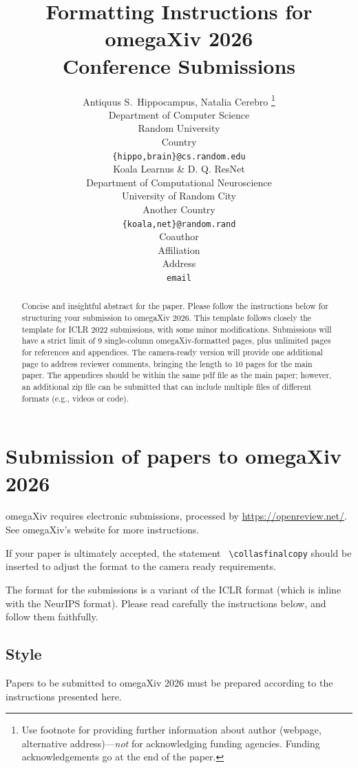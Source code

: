 \documentclass{article} %
\title{Formatting Instructions for omegaXiv 2026 \\ Conference Submissions}
\author{Antiquus S.~Hippocampus, Natalia Cerebro  \thanks{ Use footnote for providing further information
about author (webpage, alternative address)---\emph{not} for acknowledging
funding agencies.  Funding acknowledgements go at the end of the paper.} \\
Department of Computer Science\\
Random University\\
Country \\
\texttt{\{hippo,brain\}@cs.random.edu} \\
\And %
Koala Learnus \& D. Q. ResNet  \\
Department of Computational Neuroscience \\
University of Random City \\
Another Country \\
\texttt{\{koala,net\}@random.rand} \\
\AND %
Coauthor \\
Affiliation \\
Address \\
\texttt{email}
}
\begin{document}
\maketitle

\begin{abstract}
Concise and insightful abstract for the paper. Please follow the instructions below for structuring your submission to omegaXiv 2026. This template follows closely the template for ICLR 2022 submissions, with some minor modifications. Submissions will have a strict limit of 9 single-column omegaXiv-formatted pages, plus unlimited pages for references and appendices. The camera-ready version will provide one additional page to address reviewer comments, bringing the length to 10 pages for the main paper. The appendices should be within the same pdf file as the main paper; however, an additional zip file can be submitted that can include multiple files of different formats (e.g., videos or code).
\end{abstract}

\section{Submission of papers to omegaXiv 2026}

omegaXiv requires electronic submissions, processed by
\href{https://openreview.net/}{https://openreview.net/}. See omegaXiv's website for more instructions.

If your paper is ultimately accepted, the statement {\tt
  {\textbackslash}collasfinalcopy} should be inserted to adjust the
format to the camera ready requirements.

The format for the submissions is a variant of the ICLR format (which is inline with the NeurIPS format).
Please read carefully the instructions below, and follow them
faithfully.

\subsection{Style}

Papers to be submitted to omegaXiv 2026 must be prepared according to the
instructions presented here.

\end{document}
